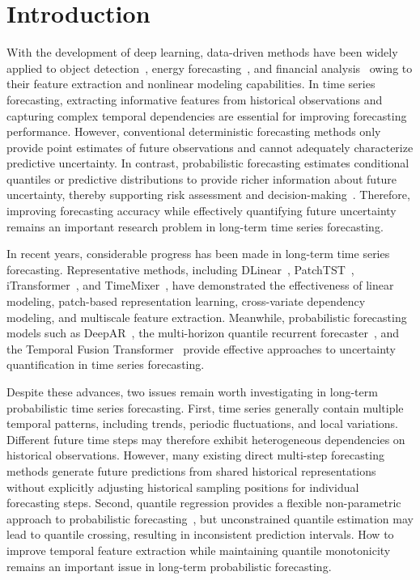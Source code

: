 \documentclass[sigconf,anonymous,review]{acmart}
\begin{document}
\section{Introduction}

With the development of deep learning, data-driven methods have been widely applied to object detection~\cite{vidal2026hybrid}, energy forecasting~\cite{abisoye2024solar}, and financial analysis~\cite{krawczyk2025financial} owing to their feature extraction and nonlinear modeling capabilities. In time series forecasting, extracting informative features from historical observations and capturing complex temporal dependencies are essential for improving forecasting performance. However, conventional deterministic forecasting methods only provide point estimates of future observations and cannot adequately characterize predictive uncertainty. In contrast, probabilistic forecasting estimates conditional quantiles or predictive distributions to provide richer information about future uncertainty, thereby supporting risk assessment and decision-making~\cite{chen2025noncrossing}. Therefore, improving forecasting accuracy while effectively quantifying future uncertainty remains an important research problem in long-term time series forecasting.

In recent years, considerable progress has been made in long-term time series forecasting. Representative methods, including DLinear~\cite{zeng2023transformers}, PatchTST~\cite{nie2023timeseries}, iTransformer~\cite{liu2024itransformer}, and TimeMixer~\cite{wang2024timemixer}, have demonstrated the effectiveness of linear modeling, patch-based representation learning, cross-variate dependency modeling, and multiscale feature extraction. Meanwhile, probabilistic forecasting models such as DeepAR~\cite{salinas2020deepar}, the multi-horizon quantile recurrent forecaster~\cite{wen2017multihorizon}, and the Temporal Fusion Transformer~\cite{lim2021temporal} provide effective approaches to uncertainty quantification in time series forecasting.

Despite these advances, two issues remain worth investigating in long-term probabilistic time series forecasting. First, time series generally contain multiple temporal patterns, including trends, periodic fluctuations, and local variations. Different future time steps may therefore exhibit heterogeneous dependencies on historical observations. However, many existing direct multi-step forecasting methods generate future predictions from shared historical representations without explicitly adjusting historical sampling positions for individual forecasting steps. Second, quantile regression provides a flexible non-parametric approach to probabilistic forecasting~\cite{koenker1978regression}, but unconstrained quantile estimation may lead to quantile crossing, resulting in inconsistent prediction intervals. How to improve temporal feature extraction while maintaining quantile monotonicity remains an important issue in long-term probabilistic forecasting.
\end{document}
